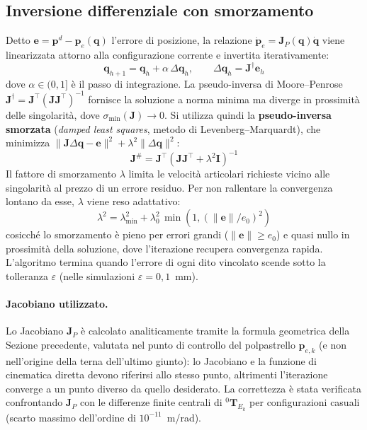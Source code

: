 \subsection{Inversione differenziale con smorzamento}

Detto $\boldsymbol e=\boldsymbol p^d-\boldsymbol p_e(\boldsymbol q)$ l'errore di posizione, la relazione $\dot{\boldsymbol p}_e=\boldsymbol J_P(\boldsymbol q)\dot{\boldsymbol q}$ viene linearizzata attorno alla configurazione corrente e invertita iterativamente:
\begin{equation}
    \boldsymbol q_{h+1}=\boldsymbol q_h+\alpha\,\Delta\boldsymbol q_h,
    \qquad
    \Delta\boldsymbol q_h=\boldsymbol J^{\dagger}\boldsymbol e_h
\end{equation}
dove $\alpha\in(0,1]$ è il passo di integrazione. La pseudo-inversa di Moore--Penrose $\boldsymbol J^{\dagger}=\boldsymbol J^\top(\boldsymbol J\boldsymbol J^\top)^{-1}$ fornisce la soluzione a norma minima ma diverge in prossimità delle singolarità, dove $\sigma_{\min}(\boldsymbol J)\to 0$. Si utilizza quindi la \textbf{pseudo-inversa smorzata} (\textit{damped least squares}, metodo di Levenberg--Marquardt), che minimizza $\|\boldsymbol J\Delta\boldsymbol q-\boldsymbol e\|^2+\lambda^2\|\Delta\boldsymbol q\|^2$:
\begin{equation}
    \boldsymbol J^{\#}=\boldsymbol J^\top\left(\boldsymbol J\boldsymbol J^\top+\lambda^2\boldsymbol I\right)^{-1}
    \label{eq:dls}
\end{equation}
Il fattore di smorzamento $\lambda$ limita le velocità articolari richieste vicino alle singolarità al prezzo di un errore residuo. Per non rallentare la convergenza lontano da esse, $\lambda$ viene reso adattativo:
\begin{equation}
    \lambda^2=\lambda_{\min}^2+\lambda_0^2\,\min\!\left(1,\left(\|\boldsymbol e\|/e_0\right)^2\right)
\end{equation}
cosicché lo smorzamento è pieno per errori grandi ($\|\boldsymbol e\|\ge e_0$) e quasi nullo in prossimità della soluzione, dove l'iterazione recupera convergenza rapida. L'algoritmo termina quando l'errore di ogni dito vincolato scende sotto la tolleranza $\varepsilon$ (nelle simulazioni $\varepsilon=0{,}1$~mm).

\paragraph{Jacobiano utilizzato.} Lo Jacobiano $\boldsymbol J_P$ è calcolato analiticamente tramite la formula geometrica della Sezione precedente, valutata nel punto di controllo del polpastrello $\boldsymbol p_{e,k}$ (e non nell'origine della terna dell'ultimo giunto): lo Jacobiano e la funzione di cinematica diretta devono riferirsi allo stesso punto, altrimenti l'iterazione converge a un punto diverso da quello desiderato. La correttezza è stata verificata confrontando $\boldsymbol J_P$ con le differenze finite centrali di ${}^0\boldsymbol T_{E_k}$ per configurazioni casuali (scarto massimo dell'ordine di $10^{-11}$~m/rad).

